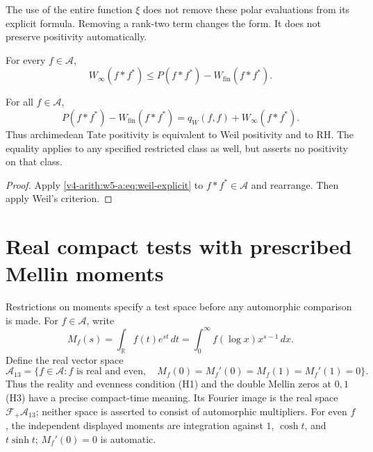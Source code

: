 The use of the entire function $\xi$ does not remove these polar
evaluations from its explicit formula. Removing a rank-two term
changes the form. It does not preserve positivity automatically.

\begin{conjecture}
\label{v4-arith:w5-a:conj:archimedean-tate-positivity}
For every $f\in\mathscr A$,
\begin{equation}
 W_\infty(f*f^*)\le P(f*f^*)-W_{\mathrm{fin}}(f*f^*).
 \label{v4-arith:w5-a:eq:archimedean-tate-positivity}
\end{equation}
\end{conjecture}

\begin{theorem}
\label{v4-arith:w5-a:thm:ATP-equals-weil-positivity}
\label{v4-arith:w5-a:thm:HPLi-restricted}
For all $f\in\mathscr A$,
\begin{equation}
 P(f*f^*)-W_{\mathrm{fin}}(f*f^*)=q_W(f,f)+W_\infty(f*f^*).
 \label{v4-arith:w5-a:eq:restricted-HPLi}
\end{equation}
Thus archimedean Tate positivity is equivalent to Weil positivity
and to RH. The equality applies to any specified restricted class
as well, but asserts no positivity on that class.
\end{theorem}
\begin{proof}
Apply \eqref{v4-arith:w5-a:eq:weil-explicit} to $f*f^*\in\mathscr A$
and rearrange. Then apply Weil's criterion.
\end{proof}

\section{Real compact tests with prescribed Mellin moments}
\label{v4-arith:pres57:moment-class}

Restrictions on moments specify a test space before any automorphic
comparison is made. For $f\in\mathscr A$, write
\[
 M_f(s)=\int_{\mathbb R}f(t)e^{st}\,dt
       =\int_0^\infty f(\log x)x^{s-1}\,dx.
\]
Define the real vector space
\[
 \mathscr A_{13}=\{f\in\mathscr A:f\text{ is real and even},\quad
 M_f(0)=M_f'(0)=M_f(1)=M_f'(1)=0\}.
\]
Thus the reality and evenness condition (H1) and the double Mellin
zeros at $0,1$ (H3) have a precise compact-time meaning.
Its Fourier image is the real space $\mathcal F_+\mathscr A_{13}$;
neither space is asserted to consist of automorphic multipliers.
For even $f$, the independent displayed moments are integration
against $1$, $\cosh t$, and $t\sinh t$; $M_f'(0)=0$ is automatic.


